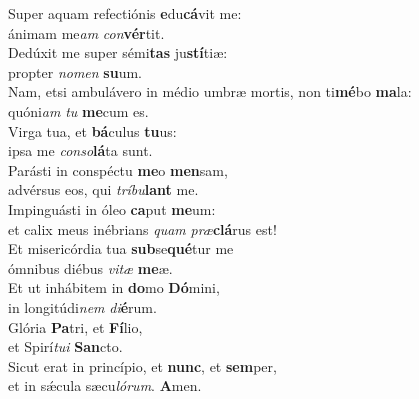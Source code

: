 \evenverse Super aquam refectiónis \textbf{e}du\textbf{cá}vit me:~\*\\
\evenverse ánimam me\textit{am} \textit{con}\textbf{vér}tit.\\
\oddverse Dedúxit me super sémi\textbf{tas} ju\textbf{stí}tiæ:~\*\\
\oddverse propter \textit{no}\textit{men} \textbf{su}um.\\
\evenverse Nam, etsi ambulávero in médio umbræ mortis, non ti\textbf{mé}bo \textbf{ma}la:~\*\\
\evenverse quóni\textit{am} \textit{tu} \textbf{me}cum es.\\
\oddverse Virga tua, et \textbf{bá}culus \textbf{tu}us:~\*\\
\oddverse ipsa me \textit{con}\textit{so}\textbf{lá}ta sunt.\\
\evenverse Parásti in conspéctu \textbf{me}o \textbf{men}sam,~\*\\
\evenverse advérsus eos, qui \textit{trí}\textit{bu}\textbf{lant} me.\\
\oddverse Impinguásti in óleo \textbf{ca}put \textbf{me}um:~\*\\
\oddverse et calix meus inébrians \textit{quam} \textit{præ}\textbf{clá}rus est!\\
\evenverse Et misericórdia tua \textbf{sub}se\textbf{qué}tur me~\*\\
\evenverse ómnibus diébus \textit{vi}\textit{tæ} \textbf{me}æ.\\
\oddverse Et ut inhábitem in \textbf{do}mo \textbf{Dó}mini,~\*\\
\oddverse in longitúdi\textit{nem} \textit{di}\textbf{é}rum.\\
\evenverse Glória \textbf{Pa}tri, et \textbf{Fí}lio,~\*\\
\evenverse et Spirí\textit{tu}\textit{i} \textbf{San}cto.\\
\oddverse Sicut erat in princípio, et \textbf{nunc}, et \textbf{sem}per,~\*\\
\oddverse et in sǽcula sæcu\textit{ló}\textit{rum}. \textbf{A}men.\\
